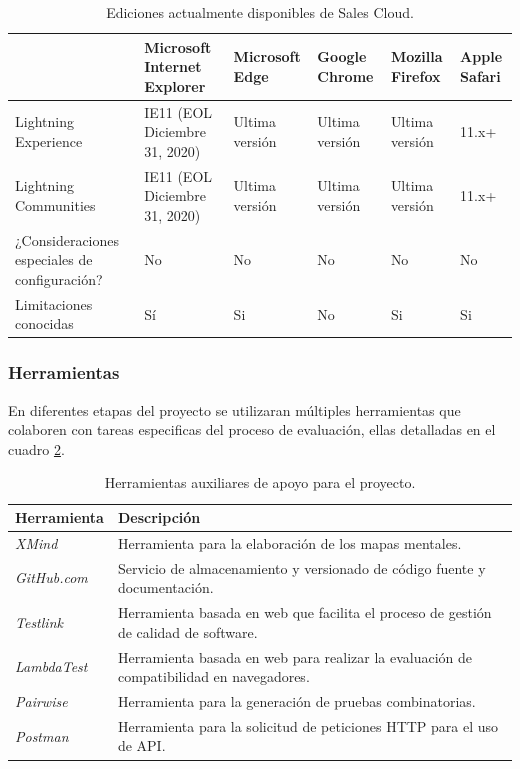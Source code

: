 \begin{table}
\centering
\begin{tabular}{|p{4.5cm}|p{1.9cm}|p{1.9cm}|p{1.9cm}|p{1.9cm}|p{1.9cm}|}
\hline
& \textbf{Microsoft Internet Explorer} & \textbf{Microsoft Edge} & \textbf{Google Chrome} & \textbf{Mozilla Firefox} & \textbf{Apple Safari} \\
\hline
Lightning Experience & IE11 (EOL Diciembre 31, 2020) & Ultima versión & Ultima versión & Ultima versión & 11.x+ \\
Lightning Communities & IE11 (EOL Diciembre 31, 2020) & Ultima versión & Ultima versión & Ultima versión & 11.x+ \\
¿Consideraciones especiales de configuración? & No & No & No & No & No \\
Limitaciones conocidas & Sí & Si & No & Si & Si \\
\hline
\end{tabular}
\caption{Ediciones actualmente disponibles de Sales Cloud.}
\label{soporte_navegadores}
\end{table}

\subsubsection{Herramientas}
En diferentes etapas del proyecto se utilizaran múltiples herramientas que
colaboren con tareas especificas del proceso de evaluación, ellas detalladas en
el cuadro \ref{herramientas}.

\begin{table}
\centering
\begin{tabular}{|l|p{13.5cm}|}
\hline
\textbf{Herramienta} & \textbf{Descripción} \\
\hline
\emph{XMind} & Herramienta para la elaboración de los mapas mentales. \\
\emph{GitHub.com} & Servicio de almacenamiento y versionado de código fuente y documentación. \\
\emph{Testlink} & Herramienta basada en web que facilita el proceso de gestión de calidad de software. \\
\emph{LambdaTest} & Herramienta basada en web para realizar la evaluación de compatibilidad en navegadores. \\
\emph{Pairwise} & Herramienta para la generación de pruebas combinatorias. \\
\emph{Postman} & Herramienta para la solicitud de peticiones HTTP para el uso de API.\\
\hline
\end{tabular}
\caption{Herramientas auxiliares de apoyo para el proyecto.}
\label{herramientas}
\end{table}

